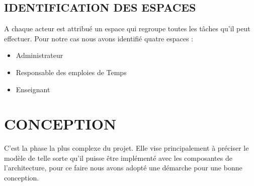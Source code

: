 \documentclass[english,12pt,a4paper]{report}
\begin{document}
\subsection{IDENTIFICATION DES ESPACES}
A chaque acteur est attribué un espace qui regroupe toutes les tâches qu’il peut
effectuer. Pour notre cas nous avons identifié quatre espaces :
\begin{itemize}
	\item Administrateur
	\item Responsable des emploies de Temps
	\item Enseignant
\end{itemize}

\section{CONCEPTION}
C’est la phase la plus complexe du projet. Elle vise principalement à préciser le modèle de telle sorte qu’il puisse être implémenté avec les composantes de l’architecture, pour ce faire nous avons adopté une démarche pour une bonne conception.
\end{document}
